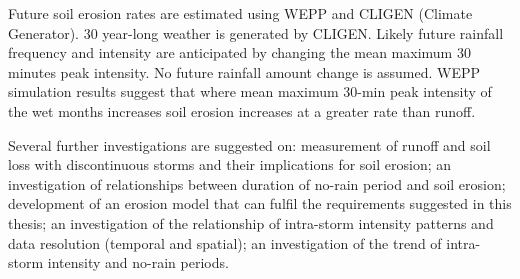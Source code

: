 \begin{abstractseparate}
Future soil erosion rates are estimated using WEPP and CLIGEN (Climate
Generator). 30 year-long weather is generated by CLIGEN. Likely future rainfall
frequency and intensity are anticipated by changing the mean maximum 30 minutes
peak intensity. No future rainfall amount change is assumed. WEPP simulation
results suggest that where mean maximum 30-min peak intensity of the wet months
increases soil erosion increases at a greater rate than runoff.

Several further investigations are suggested on: measurement of runoff and soil
loss with discontinuous storms and their implications for soil erosion; an
investigation of relationships between duration of no-rain period and soil
erosion; development of an erosion model that can fulfil the requirements
suggested in this thesis; an investigation of the relationship of intra-storm
intensity patterns and data resolution (temporal and spatial); an investigation of
the trend of intra-storm intensity and no-rain periods.
\end{abstractseparate}
